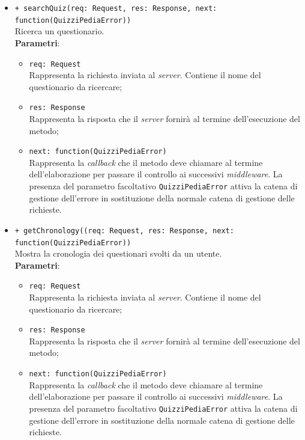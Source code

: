 \begin{itemize}
\begin{itemize}
		\item \texttt{+ searchQuiz(req: Request, res: Response, next: function(QuizziPediaError))}\\
		Ricerca un questionario.\\
		\textbf{Parametri}:
		\begin{itemize}
			\item \texttt{req: Request}\\
			Rappresenta la richiesta inviata al \textit{server}. Contiene il nome del questionario da ricercare;
			\item \texttt{res: Response}\\
			Rappresenta la risposta che il \textit{server} fornirà al termine dell'esecuzione del metodo;
			\item \texttt{next: function(QuizziPediaError)}\\
			Rappresenta la \textit{callback} che il metodo deve chiamare al termine dell'elaborazione per passare il controllo ai successivi \textit{middleware}. La presenza del parametro facoltativo \texttt{QuizziPediaError} attiva la catena di gestione dell'errore in sostituzione della normale catena di gestione delle richieste.
		\end{itemize}
		
		\item \texttt{+ getChronology((req: Request, res: Response, next: function(QuizziPediaError))}\\
			Mostra la cronologia dei questionari svolti da un utente.\\
			\textbf{Parametri}:
			\begin{itemize}
				\item \texttt{req: Request}\\
			Rappresenta la richiesta inviata al \textit{server}. Contiene il nome del questionario da ricercare;
				\item \texttt{res: Response}\\
			Rappresenta la risposta che il \textit{server} fornirà al termine dell'esecuzione del metodo;
				\item \texttt{next: function(QuizziPediaError)}\\
			Rappresenta la \textit{callback} che il metodo deve chiamare al termine dell'elaborazione per passare il controllo ai successivi \textit{middleware}. La presenza del parametro facoltativo \texttt{QuizziPediaError} attiva la catena di gestione dell'errore in sostituzione della normale catena di gestione delle richieste.
			\end{itemize}
		

\end{itemize}
\end{itemize}
